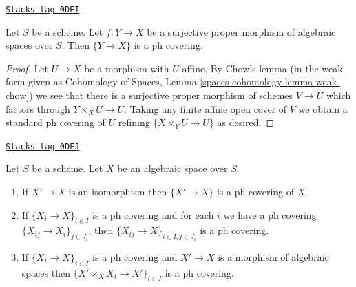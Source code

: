 \begin{lemma}
\label{spaces-topologies-lemma-surjective-proper-ph}
\href{https://stacks.math.columbia.edu/tag/0DFI}{\texttt{Stacks tag 0DFI}}

Let $S$ be a scheme. Let $f : Y \to X$ be a surjective proper morphism
of algebraic spaces over $S$. Then $\{Y \to X\}$ is a ph covering.
\end{lemma}

\begin{proof}
Let $U \to X$ be a morphism with $U$ affine.
By Chow's lemma (in the weak form given as
Cohomology of Spaces, Lemma \ref{spaces-cohomology-lemma-weak-chow})
we see that there is a surjective proper morphism of schemes
$V \to U$ which factors through $Y \times_X U \to U$.
Taking any finite affine open cover of $V$ we obtain a
standard ph covering of $U$ refining $\{X \times_Y U \to U\}$
as desired.
\end{proof}

\begin{lemma}[Ph]
\label{spaces-topologies-lemma-ph}
\href{https://stacks.math.columbia.edu/tag/0DFJ}{\texttt{Stacks tag 0DFJ}}

Let $S$ be a scheme. Let $X$ be an algebraic space over $S$.
\begin{enumerate}
\item If $X' \to X$ is an isomorphism then $\{X' \to X\}$
is a ph covering of $X$.
\item If $\{X_i \to X\}_{i\in I}$ is a ph covering and for each
$i$ we have a ph covering $\{X_{ij} \to X_i\}_{j\in J_i}$, then
$\{X_{ij} \to X\}_{i \in I, j\in J_i}$ is a ph covering.
\item If $\{X_i \to X\}_{i\in I}$ is a ph covering
and $X' \to X$ is a morphism of algebraic spaces then
$\{X' \times_X X_i \to X'\}_{i\in I}$ is a ph covering.
\end{enumerate}
\end{lemma}

